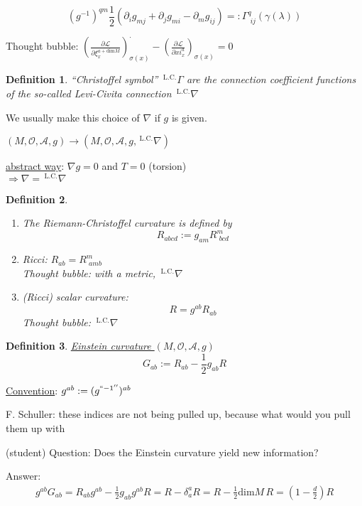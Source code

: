\documentclass[10pt, twoside]{amsart}
\newtheorem{definition}{Definition}
\begin{document}
\begin{multicols*}{2}
\[
\boxed{ (g^{-1})^{qm}\frac{1}{2} (\partial_i g_{mj} + \partial_j g_{mi} -  \partial_m g_{ij} ) =: \Gamma^q_{ \,\, ij}(\gamma(\lambda))
}
\]

Thought bubble: $\left( \frac{ \partial \mathcal{L}}{ \partial \xi_x^{a+\text{dim}M } } \right)^{\cdot}_{\sigma(x)} - \left( \frac{ \partial \mathcal{L}}{ \partial xi^a_x } \right)_{\sigma(x)} = 0$

\begin{definition}
``Christoffel symbol''   ${\,}^{\text{L.C.}}\Gamma$ are the connection coefficient functions of the so-called Levi-Civita connection ${\,}^{\text{L.C.}}\nabla$
\end{definition}
We usually make this choice of $\nabla$ if $g$ is given.  

$(M,\mathcal{O}, \mathcal{A},g) \to (M,\mathcal{O}, \mathcal{A}, g, {\,}^{\text{L.C.}}\nabla)$

\underline{abstract way}: $\nabla g = 0$ and $T=0$ (torsion) \\
$\Longrightarrow \nabla = {\,}^{\text{L.C.}}\nabla$


\begin{definition}
\begin{enumerate}
\item[(a)]
  The Riemann-Christoffel curvature is defined by 
\[
R_{abcd} := g_{am}R^m_{\,\,bcd}
\]
\item[(b)] Ricci: $R_{ab} = R^m_{\,\,amb}$ \\
Thought bubble: with a metric, ${\,}^{\text{L.C.}}\nabla$
\item[(c)] (Ricci) scalar curvature:
\[
R = g^{ab} R_{ab}
\]
Thought bubble: ${\,}^{\text{L.C.}}\nabla$
\end{enumerate}
\end{definition}

\begin{definition}
 \underline{ Einstein curvature } $(M,\mathcal{O}, \mathcal{A},g)$
\[
G_{ab}:= R_{ab} - \frac{1}{2} g_{ab} R
\]
\end{definition}

\underline{Convention}: $g^{ab} := (g^{``-1''})^{ab}$

F. Schuller: these indices are not being pulled up, because what would you pull them up with

(student) Question: Does the Einstein curvature yield new information?

Answer: 
\[
\begin{gathered}
  g^{ab} G_{ab} = R_{ab} g^{ab} - \frac{1}{2} g_{ab} g^{ab} R = R - \delta^a_a R = R - \frac{1}{2} \text{dim}M \, R = (1- \frac{d}{2}) R
\end{gathered}
\]


\end{multicols*}
\end{document}
